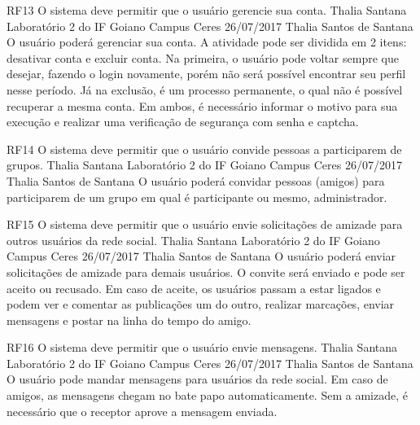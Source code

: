  \requisitoFuncional
 {RF13}
 {O sistema deve permitir que o usuário gerencie sua conta.}
 {Thalia Santana}
 {Laboratório 2 do IF Goiano Campus Ceres}
 {26/07/2017}
 {Thalia Santos de Santana}
 {O usuário poderá gerenciar sua conta. A atividade pode ser dividida em 2 itens: desativar conta e excluir conta. Na primeira, o usuário pode voltar sempre que desejar, fazendo o login novamente, porém não será possível encontrar seu perfil nesse período. Já na exclusão, é um processo permanente,  o qual não é possível recuperar a mesma conta. Em ambos, é necessário informar o motivo para sua execução e realizar uma verificação de segurança com  senha e captcha.  
 }
 
 \requisitoFuncional
 {RF14}
 {O sistema deve permitir que o usuário convide pessoas a participarem de grupos.}
 {Thalia Santana}
 {Laboratório 2 do IF Goiano Campus Ceres}
 {26/07/2017}
 {Thalia Santos de Santana}
 {O usuário poderá convidar pessoas (amigos) para participarem de um grupo em qual é participante ou mesmo, administrador.
 }
 
 \requisitoFuncional
 {RF15}
 {O sistema deve permitir que o usuário envie solicitações de amizade para outros usuários da rede social.}
 {Thalia Santana}
 {Laboratório 2 do IF Goiano Campus Ceres}
 {26/07/2017}
 {Thalia Santos de Santana}
 {O usuário poderá enviar solicitações de amizade para demais usuários. O convite será enviado e pode ser aceito ou recusado.  Em caso de aceite, os usuários passam a estar ligados e podem ver e comentar as publicações um do outro, realizar marcações, enviar mensagens e postar na linha do tempo do amigo.
 }
 
 \requisitoFuncional
 {RF16}
 {O sistema deve permitir que o usuário envie mensagens.}
 {Thalia Santana}
 {Laboratório 2 do IF Goiano Campus Ceres}
 {26/07/2017}
 {Thalia Santos de Santana}
 {O usuário pode mandar mensagens para usuários da rede social. Em caso de amigos, as mensagens chegam no bate papo automaticamente. Sem a amizade, é necessário que o receptor aprove a mensagem enviada.
 }
 
